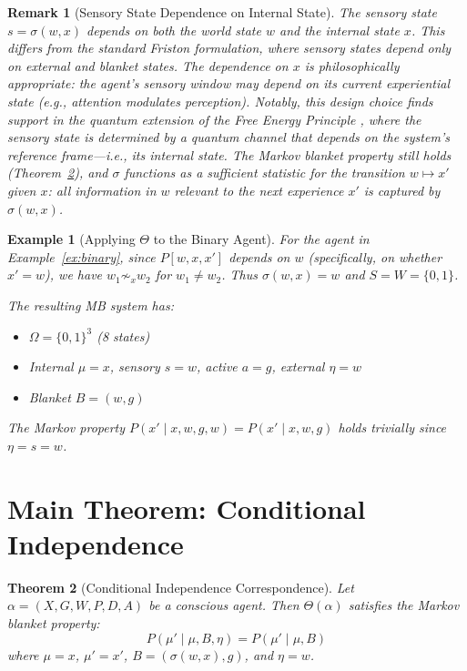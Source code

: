 \documentclass[11pt,a4paper]{article}
\newtheorem{theorem}{Theorem}[section]
\newtheorem{example}[theorem]{Example}
\newtheorem*{remark}{Remark}
\begin{document}
\begin{remark}[Sensory State Dependence on Internal State]
The sensory state $s = \sigma(w, x)$ depends on both the world state $w$ and the internal state $x$. This differs from the standard Friston formulation, where sensory states depend only on external and blanket states. The dependence on $x$ is philosophically appropriate: the agent's sensory window may depend on its current experiential state (e.g., attention modulates perception). Notably, this design choice finds support in the quantum extension of the Free Energy Principle \cite{fields2022}, where the sensory state is determined by a quantum channel that depends on the system's reference frame---i.e., its internal state. The Markov blanket property still holds (Theorem~\ref{thm:main}), and $\sigma$ functions as a sufficient statistic for the transition $w \mapsto x'$ given $x$: all information in $w$ relevant to the next experience $x'$ is captured by $\sigma(w, x)$.
\end{remark}

\begin{example}[Applying $\Theta$ to the Binary Agent]\label{ex:theta-binary}
For the agent in Example~\ref{ex:binary}, since $P[w, x, x']$ depends on $w$ (specifically, on whether $x' = w$), we have $w_1 \not\sim_x w_2$ for $w_1 \neq w_2$. Thus $\sigma(w, x) = w$ and $S = W = \{0, 1\}$.

The resulting MB system has:
\begin{itemize}[nosep]
    \item $\Omega = \{0,1\}^3$ (8 states)
    \item Internal $\mu = x$, sensory $s = w$, active $a = g$, external $\eta = w$
    \item Blanket $B = (w, g)$
\end{itemize}
The Markov property $P(x' \mid x, w, g, w) = P(x' \mid x, w, g)$ holds trivially since $\eta = s = w$.
\end{example}

\section{Main Theorem: Conditional Independence}

\begin{theorem}[Conditional Independence Correspondence]\label{thm:main}
Let $\alpha = (X, G, W, P, D, A)$ be a conscious agent. Then $\Theta(\alpha)$ satisfies the Markov blanket property:
\[
P(\mu' \mid \mu, B, \eta) = P(\mu' \mid \mu, B)
\]
where $\mu = x$, $\mu' = x'$, $B = (\sigma(w, x), g)$, and $\eta = w$.
\end{theorem}
\end{document}
